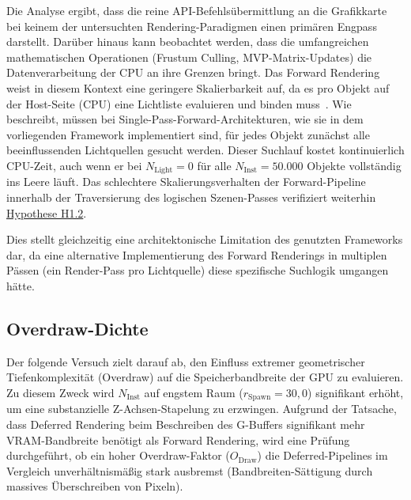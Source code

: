 Die Analyse ergibt, dass die reine \ac{API}-Befehlsübermittlung an die Grafikkarte bei keinem der untersuchten
Rendering-Paradigmen einen primären Engpass darstellt.
Darüber hinaus kann beobachtet werden, dass die umfangreichen mathematischen Operationen (Frustum Culling,
\ac{MVP}-Matrix-Updates) die Datenverarbeitung der \ac{CPU} an ihre Grenzen bringt.
Das Forward Rendering weist in diesem Kontext eine geringere Skalierbarkeit auf, da es pro Objekt auf der Host-Seite
(\ac{CPU}) eine Lichtliste evaluieren und binden muss~\cite[S.~891]{akenine-mollerRealtimeRendering2019}.
Wie~\textcite[S.~1]{Thaler2011DeferredRendering} beschreibt, müssen bei Single-Pass-Forward-Architekturen, wie sie in
dem vorliegenden Framework implementiert sind, für jedes Objekt zunächst alle beeinflussenden Lichtquellen gesucht
werden.
Dieser Suchlauf kostet kontinuierlich \ac{CPU}-Zeit, auch wenn er bei $N_{\text{Light}} = 0$ für alle $N_{\text{Inst}}
= 50.000$ Objekte vollständig ins Leere läuft.
Das schlechtere Skalierungsverhalten der Forward-Pipeline innerhalb der Traversierung des logischen
Szenen-Passes verifiziert weiterhin \hyperlink{hyp:H1.2}{Hypothese H1.2}.

Dies stellt gleichzeitig eine architektonische Limitation des genutzten Frameworks dar, da eine alternative
Implementierung des Forward Renderings in multiplen Pässen (ein Render-Pass pro Lichtquelle) diese spezifische
Suchlogik umgangen hätte.

\subsection{{Overdraw-Dichte}}
\label{subsec:050203_overdraw_eval}

Der folgende Versuch zielt darauf ab, den Einfluss extremer geometrischer Tiefenkomplexität (Overdraw) auf die
Speicherbandbreite der \ac{GPU} zu evaluieren.
Zu diesem Zweck wird $N_{\text{Inst}}$ auf engstem Raum ($r_{\text{Spawn}} = 30{,}0$) signifikant erhöht, um eine
substanzielle Z-Achsen-Stapelung zu erzwingen.
Aufgrund der Tatsache, dass Deferred Rendering beim Beschreiben des \ac{G-Buffer}s signifikant mehr
\ac{VRAM}-Bandbreite benötigt als Forward Rendering, wird eine Prüfung durchgeführt, ob ein hoher Overdraw-Faktor
($O_{\text{Draw}}$) die Deferred-Pipelines im Vergleich unverhältnismäßig stark ausbremst (Bandbreiten-Sättigung durch
massives Überschreiben von Pixeln).

